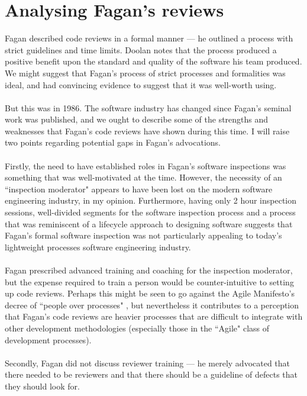 \section{Analysing Fagan's reviews} \label{sec:litsurvey:strWeak}

Fagan described code reviews in a formal manner --- he outlined a process with strict guidelines and
time limits.
Doolan \cite{doolan1992experience} notes that the process produced a positive benefit upon the
standard and quality of the software his team produced.
We might suggest that Fagan's process of strict processes and formalities was ideal, and had
convincing evidence to suggest that it was well-worth using.\\
\\
But this was in 1986.
The software industry has changed since Fagan's seminal work was published, and we ought to describe
some of the strengths and weaknesses that Fagan's code reviews have shown during this time.
I will raise two points regarding potential gaps in Fagan's advocations.\\
\\
Firstly, the need to have established roles in Fagan's software inspections was something that was
well-motivated at the time.
However, the necessity of an ``inspection moderator" appears to have been lost on the modern
software engineering industry, in my opinion.
Furthermore, having only 2 hour inspection sessions, well-divided segments for the software inspection process
and a process that was reminiscent of a lifecycle approach to designing software suggests that
Fagan's formal software inspection was not particularly appealing to today's lightweight processes
software engineering industry.\\
\\
Fagan prescribed advanced training and coaching for the inspection moderator, but the expense
required to train a person would be counter-intuitive to setting up code reviews.
Perhaps this might be seen to go against the Agile Manifesto's decree of ``people over processes"
\FIXME, but nevertheless it contributes to a perception that Fagan's code reviews are heavier
processes that are difficult to integrate with other development methodologies (especially those in
the ``Agile" class of development processes).\\
\\
Secondly, Fagan did not discuss reviewer training --- he merely advocated that there needed to be
reviewers and that there should be a guideline of defects that they should look for.

